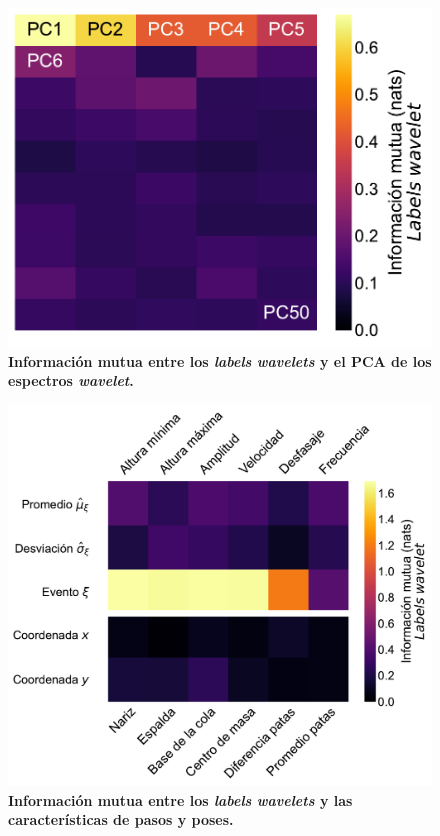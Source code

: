 \begin{appendix}
    \begin{figure}[htbp]
        \centering
        \includegraphics[width=0.7\linewidth]{figuras/capitulo4/mi_labels_pca.pdf}
        \caption{\textbf{Información mutua entre los \textit{labels} \textit{wavelets} y el PCA de los espectros \textit{wavelet}.}}
        \label{fig:capitulo4_mi_labels_pca}
    \end{figure}

    \begin{figure}[htbp]
        \centering
        \includegraphics[width=0.7\linewidth]{figuras/capitulo4/mi_contra_labels_scaler_stp.pdf}
        \caption{\textbf{Información mutua entre los \textit{labels} \textit{wavelets} y las características de pasos y poses.}}
        \label{fig:capitulo4_mi_contra_labels_scaler_stp}
    \end{figure}


\end{appendix}
